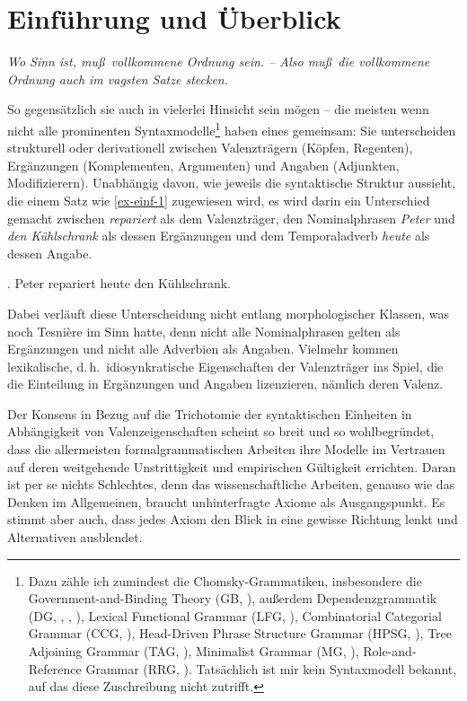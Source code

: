 \chapter{Einführung und Überblick} \label{sec-einfuehrung}


\epigraph{\em Wo Sinn ist, mu\ss \ vollkommene Ordnung sein. -- Also mu\ss \ die vollkommene Ordnung auch im vagsten Satze stecken.\\[-5ex]}{\citet[\S 98]{Wittgenstein:84}}

\noindent So gegensätzlich sie auch in vielerlei Hinsicht sein mögen -- die meisten wenn nicht alle prominenten Syntaxmodelle\footnote{Dazu zähle ich zumindest die Chomsky-Grammatiken, insbesondere die Government-and-Binding Theory (GB, \citealt{Chomsky:81}), au\ss erdem Dependenzgrammatik (DG, \citealt{Tesniere:59}, \citealt{Kunze:75}, \citealt{Heringer:96}), Lexical Functional Grammar (LFG, \citealt{Kaplan:Bresnan:82}), Combinatorial Categorial Grammar (CCG, \citealt{Steedman:00}), Head-Driven Phrase Structure Grammar (HPSG, \citealt{Pollard:Sag:94}), Tree Adjoining Grammar (TAG, \citealt{Joshi:Schabes:97}), Minimalist Grammar (MG, \citealt{Stabler:97}), Role-and-Reference Grammar (RRG, \citealt{Valin:05}). Tatsächlich ist mir kein Syntaxmodell bekannt, auf das diese Zuschreibung nicht zutrifft.} haben eines gemeinsam: Sie unterscheiden strukturell oder derivationell zwischen Valenzträgern (Köpfen, Regenten), Ergänzungen (Komplementen, Argumenten) und Angaben (Adjunkten, Modifizierern). Unabhängig davon, wie jeweils die syntaktische Struktur aussieht, die einem Satz wie \ref{ex-einf-1} zugewiesen wird, es wird darin ein Unterschied gemacht zwischen {\it repariert} als dem Valenzträger, den Nominalphrasen {\it Peter} und {\it den Kühlschrank} als dessen Ergänzungen und dem Temporaladverb {\it heute} als dessen Angabe.
  
\ex. \label{ex-einf-1} Peter repariert heute den Kühlschrank.

Dabei verläuft diese Unterscheidung nicht entlang morphologischer Klassen, was noch Tesni\`ere im Sinn hatte, denn nicht alle Nominalphrasen gelten als Ergänzungen und nicht alle Adverbien als Angaben. Vielmehr kommen lexikalische, d.\,h.\ idiosynkratische Eigenschaften der Valenzträger ins Spiel, die die Einteilung in Ergänzungen und Angaben lizenzieren, nämlich deren Valenz.   

Der Konsens in Bezug auf die Trichotomie der syntaktischen Einheiten in Abhängigkeit von Valenzeigenschaften scheint so breit und so wohlbegründet, dass die allermeisten formalgrammatischen Arbeiten ihre Modelle im Vertrauen auf deren weitgehende Unstrittigkeit und empirischen Gültigkeit errichten. Daran ist per se nichts Schlechtes, denn das wissenschaftliche Arbeiten, genauso wie das Denken im Allgemeinen, braucht unhinterfragte Axiome als Ausgangspunkt. Es stimmt aber auch, dass jedes Axiom den Blick in eine gewisse Richtung lenkt und Alternativen ausblendet. 

